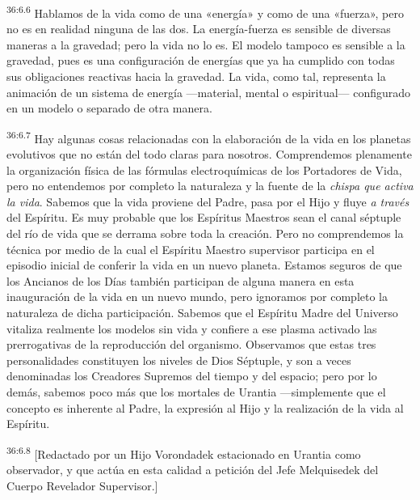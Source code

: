 \par
\textsuperscript{36:6.6} Hablamos de la vida como de una «energía» y como de una «fuerza», pero no es en realidad ninguna de las dos. La energía-fuerza es sensible de diversas maneras a la gravedad; pero la vida no lo es. El modelo tampoco es sensible a la gravedad, pues es una configuración de energías que ya ha cumplido con todas sus obligaciones reactivas hacia la gravedad. La vida, como tal, representa la animación de un sistema de energía ---material, mental o espiritual--- configurado en un modelo o separado de otra manera.

\par
\textsuperscript{36:6.7} Hay algunas cosas relacionadas con la elaboración de la vida en los planetas evolutivos que no están del todo claras para nosotros. Comprendemos plenamente la organización física de las fórmulas electroquímicas de los Portadores de Vida, pero no entendemos por completo la naturaleza y la fuente de la \textit{chispa que activa la vida}. Sabemos que la vida proviene del Padre, pasa por el Hijo y fluye \textit{a través} del Espíritu. Es muy probable que los Espíritus Maestros sean el canal séptuple del río de vida que se derrama sobre toda la creación. Pero no comprendemos la técnica por medio de la cual el Espíritu Maestro supervisor participa en el episodio inicial de conferir la vida en un nuevo planeta. Estamos seguros de que los Ancianos de los Días también participan de alguna manera en esta inauguración de la vida en un nuevo mundo, pero ignoramos por completo la naturaleza de dicha participación. Sabemos que el Espíritu Madre del Universo vitaliza realmente los modelos sin vida y confiere a ese plasma activado las prerrogativas de la reproducción del organismo. Observamos que estas tres personalidades constituyen los niveles de Dios Séptuple, y son a veces denominadas los Creadores Supremos del tiempo y del espacio; pero por lo demás, sabemos poco más que los mortales de Urantia ---simplemente que el concepto es inherente al Padre, la expresión al Hijo y la realización de la vida al Espíritu.

\par
\textsuperscript{36:6.8} [Redactado por un Hijo Vorondadek estacionado en Urantia como observador, y que actúa en esta calidad a petición del Jefe Melquisedek del Cuerpo Revelador Supervisor.]